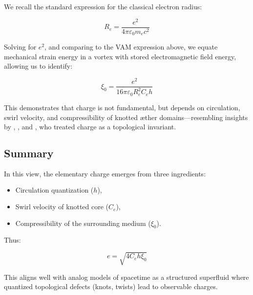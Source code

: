 We recall the standard expression for the classical electron radius:

\begin{equation}
    R_e = \frac{e^2}{4\pi \varepsilon_0 m_e c^2}
\end{equation}

Solving for \( e^2 \), and comparing to the VAM expression above, we equate mechanical strain energy in a vortex with stored electromagnetic field energy, allowing us to identify:

\begin{equation}
    \xi_0 = \frac{e^2}{16\pi \varepsilon_0 R_e^2 C_e h}
\end{equation}

This demonstrates that charge is not fundamental, but depends on circulation, swirl velocity, and compressibility of knotted æther domains—resembling insights by \cite{ranada1989topological}, \cite{bowick1994charge}, and \cite{sidharth2006vortex}, who treated charge as a topological invariant.

\subsection*{Summary}

In this view, the elementary charge emerges from three ingredients:

\begin{itemize}
    \item Circulation quantization (\( h \)),
    \item Swirl velocity of knotted core (\( C_e \)),
    \item Compressibility of the surrounding medium (\( \xi_0 \)).
\end{itemize}

Thus:

\begin{equation}
    \boxed{e = \sqrt{4 C_e h \xi_0}}
\end{equation}

This aligns well with analog models of spacetime as a structured superfluid where quantized topological defects (knots, twists) lead to observable charges.
